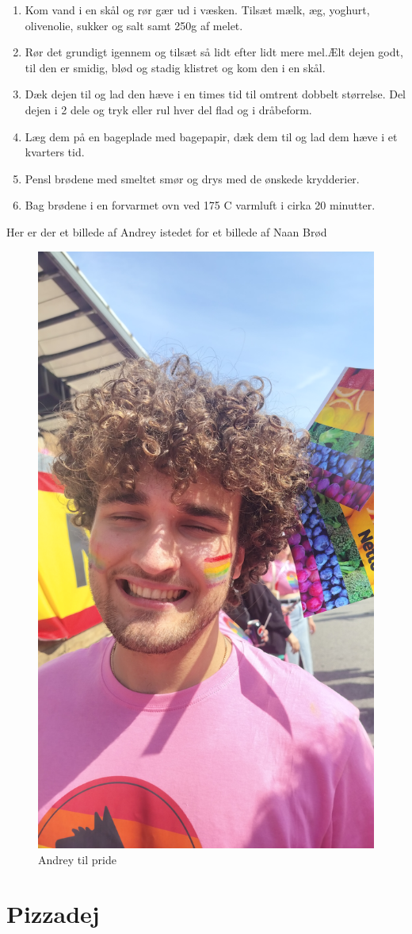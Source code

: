 \documentclass{book}
\begin{document}
\begin{minipage}[t]{0.5\textwidth}
\begin{enumerate}
    \item Kom vand i en skål og rør gær ud i væsken. Tilsæt mælk, æg, yoghurt, olivenolie, sukker og salt samt 250g af  melet. 
    \item Rør det grundigt igennem og tilsæt så lidt efter lidt mere mel.Ælt dejen godt, til den er smidig, blød og stadig klistret og kom den i en skål.
    \item Dæk dejen til og lad den hæve i en times tid til omtrent dobbelt størrelse. Del dejen i 2 dele og tryk eller rul hver del flad og i dråbeform. 
    \item Læg dem på en bageplade med bagepapir, dæk dem til og lad dem hæve i et kvarters tid.
    \item Pensl brødene med smeltet smør og drys med de ønskede krydderier.
    \item Bag brødene i en forvarmet ovn ved 175 \degree C varmluft i cirka 20 minutter.

\end{enumerate}
\end{minipage}
\newpage Her er der et billede af Andrey istedet for et billede af Naan Brød
\begin{figure}
    \centering
    \includegraphics[width=0.5\linewidth]{Andrey.jpg}
    \caption{Andrey til pride}
\end{figure}
\newpage \section{Pizzadej}
\end{document}
